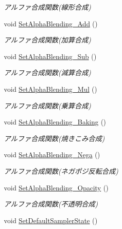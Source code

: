 \begin{DoxyCompactItemize}
\begin{DoxyCompactList}\small\item\em アルファ合成関数(線形合成) \end{DoxyCompactList}\item 
void \mbox{\hyperlink{class_renderer_direct_x9_aa552107a3d5f8a61347fe10741fd04a3}{Set\+Alpha\+Blending\+\_\+\+Add}} ()
\begin{DoxyCompactList}\small\item\em アルファ合成関数(加算合成) \end{DoxyCompactList}\item 
void \mbox{\hyperlink{class_renderer_direct_x9_a6ddbb9f801ef6b2c86ec5cd4e97b317b}{Set\+Alpha\+Blending\+\_\+\+Sub}} ()
\begin{DoxyCompactList}\small\item\em アルファ合成関数(減算合成) \end{DoxyCompactList}\item 
void \mbox{\hyperlink{class_renderer_direct_x9_a75dbeaa680610e655c6ff202591f50d7}{Set\+Alpha\+Blending\+\_\+\+Mul}} ()
\begin{DoxyCompactList}\small\item\em アルファ合成関数(乗算合成) \end{DoxyCompactList}\item 
void \mbox{\hyperlink{class_renderer_direct_x9_a083f55d941075227189769fd9807ffd1}{Set\+Alpha\+Blending\+\_\+\+Baking}} ()
\begin{DoxyCompactList}\small\item\em アルファ合成関数(焼きこみ合成) \end{DoxyCompactList}\item 
void \mbox{\hyperlink{class_renderer_direct_x9_a5018efa829bf845405ac70beef7df947}{Set\+Alpha\+Blending\+\_\+\+Nega}} ()
\begin{DoxyCompactList}\small\item\em アルファ合成関数(ネガポジ反転合成) \end{DoxyCompactList}\item 
void \mbox{\hyperlink{class_renderer_direct_x9_a789206ba211e9cbffe0bfe4c7dfb7457}{Set\+Alpha\+Blending\+\_\+\+Opacity}} ()
\begin{DoxyCompactList}\small\item\em アルファ合成関数(不透明合成) \end{DoxyCompactList}\item 
void \mbox{\hyperlink{class_renderer_direct_x9_a229cd266427d96486c43d2e63300e438}{Set\+Default\+Sampler\+State}} ()

\end{DoxyCompactItemize}
